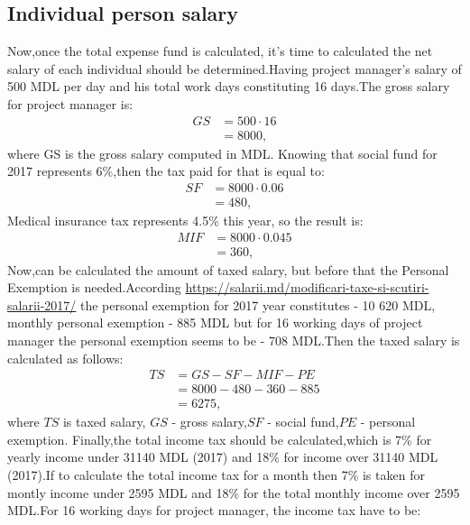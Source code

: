 \subsection{Individual person salary}
Now,once the total expense fund is calculated, it's time to calculated the net salary of each individual should be determined.Having project manager's salary of 500 MDL per day and his total work days constituting  16 days.The gross salary for project manager is:
\begin{equation}
\label{eq:sf}
	\begin{split}
	GS  &=  500 \cdot 16\\ 
	&= 8000,
	\end{split}
\end{equation}
where GS is the gross salary computed in MDL.
Knowing that social fund for 2017 represents 6\%,then the tax paid for that is equal to:
\begin{equation}
\label{eq:sf}
	\begin{split}
	SF  &=  8000 \cdot 0.06\\ 
	&= 480,
	\end{split}
\end{equation}
Medical insurance tax represents 4.5\% this year, so the result is:
\begin{equation}
\label{eq:sf}
	\begin{split}
	MIF  &=  8000 \cdot 0.045\\ 
	&= 360,
	\end{split}
\end{equation}
Now,can be calculated the amount of taxed salary, but before that the Personal Exemption is needed.According \url{https://salarii.md/modificari-taxe-si-scutiri-salarii-2017/} \cite{salarii} the personal exemption for 2017 year constitutes - 10 620 MDL, monthly personal exemption - 885 MDL but for 16 working days of project manager the personal exemption seems to be - 708 MDL.Then the taxed salary is calculated as follows:
\begin{equation}
\label{eq:sf}
\begin{split}
TS  &=  GS - SF - MIF - PE\\ 
&= 8000 - 480 - 360 - 885\\
&= 6275,
\end{split}
\end{equation}
where $TS$ is taxed salary, $GS$ - gross salary,$SF$ - social fund,$PE$ - personal exemption.
Finally,the total income tax should be calculated,which is 7\% for yearly income under 31140 MDL (2017) and 18\% for income over 31140 MDL (2017).If to calculate the total income tax for a month then 7\% is taken for montly income under 2595 MDL and 18\% for the total monthly income over 2595 MDL.For 16 working days for project manager, the income tax have to be: \\
